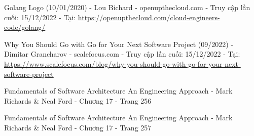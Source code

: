 {\begin{thebibliography}{80}
    Golang Logo (10/01/2020) - Lou Bichard - openupthecloud.com - Truy cập lần cuối: 15/12/2022 - Tại: \url{https://openupthecloud.com/cloud-engineers-code/golang/}

    Why You Should Go with Go for Your Next Software Project (09/2022) - Dimitar Grancharov - scalefocus.com - Truy cập lần cuối: 15/12/2022 - Tại: \url{https://www.scalefocus.com/blog/why-you-should-go-with-go-for-your-next-software-project}

    Fundamentals of Software Architecture An Engineering Approach - Mark Richards \& Neal Ford - Chương 17 - Trang 256

    Fundamentals of Software Architecture An Engineering Approach - Mark Richards \& Neal Ford - Chương 17 - Trang 257



\end{thebibliography}

\clearpage}